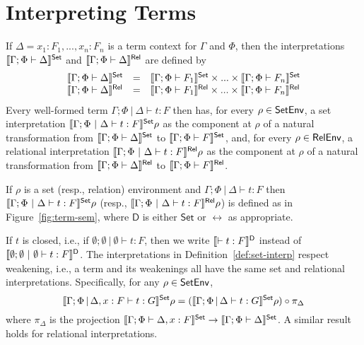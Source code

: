 \documentclass{lmcs}
\theoremstyle{plain}\newtheorem{satz}[thm]{Satz}
\newcommand{\set}{\mathsf{Set}}
\begin{document}
\section{Interpreting Terms}\label{sec:term-interp}

If $\Delta = x_1 : F_1,...,x_n : F_n$ is a term context for $\Gamma$
and $\Phi$, then the interpretations $\setsem{\Gamma;\Phi \vdash
  \Delta}$ and $\llbracket{\Gamma;\Phi \vdash \Delta}\rrbracket^{\mathsf{Rel}}$ are defined by
\[\begin{array}{lll}
\setsem{\Gamma;\Phi \vdash \Delta} & = & \setsem{\Gamma;\Phi \vdash
  F_1} \times ... \times \setsem{\Gamma;\Phi \vdash F_n}\\ 
\relsem{\Gamma;\Phi \vdash \Delta} & = & \relsem{\Gamma;\Phi \vdash
  F_1} \times ... \times \relsem{\Gamma;\Phi \vdash F_n}\\ 
\end{array}\]
Every well-formed term $\Gamma;\Phi~|~\Delta \vdash t : F$ then has,
for every $\rho \in \mathsf{SetEnv}$, a set interpretation
$\setsem{\Gamma;\Phi~|~\Delta \vdash t : F}\rho$ as the component at
$\rho$ of a natural transformation from $\setsem{\Gamma; \Phi \vdash
  \Delta}$ to $\setsem{\Gamma; \Phi \vdash F}$, and, for every $\rho
\in \mathsf{RelEnv}$, a relational interpretation
$\llbracket{\Gamma;\Phi~|~\Delta \vdash t : F}\rrbracket^{\mathsf{Rel}}\rho$ as the component at
$\rho$ of a natural transformation from $\llbracket{\Gamma; \Phi \vdash
  \Delta}\rrbracket^{\mathsf{Rel}}$ to $\llbracket{\Gamma; \Phi \vdash F}\rrbracket^{\mathsf{Rel}}$.

\begin{defi}\label{def:set-interp}
If $\rho$ is a set (resp., relation) environment and
$\Gamma;\Phi~|~\Delta \vdash t : F$ then
$\setsem{\Gamma;\Phi~|~\Delta \vdash t : F}\rho$ (resp.,
$\llbracket{\Gamma;\Phi~|~\Delta \vdash t : F}\rrbracket^{\mathsf{Rel}}\rho$) is defined as in
Figure~\ref{fig:term-sem}, where $\mathsf D$ is either $\set$ or
$\rel$ as appropriate.
\end{defi}

If $t$ is closed, i.e., if $\emptyset; \emptyset~|~\emptyset \vdash t
: F$, then we write $\llbracket{\vdash t : F}\rrbracket^{\mathsf D}$ instead of $\llbracket{\emptyset;
  \emptyset~|~\emptyset \vdash t : F}\rrbracket^{\mathsf D}$.  The interpretations in
Definition~\ref{def:set-interp} respect weakening, i.e., a term and
its weakenings all have the same set and relational
interpretations. Specifically, for any $\rho \in \mathsf{SetEnv}$,
\[\setsem{\Gamma;\Phi \,|\, \Delta, x : F \vdash t : G}\rho =
(\setsem{\Gamma;\Phi \,|\, \Delta \vdash t : G}\rho) \circ
\pi_{\Delta}\] where $\pi_{\Delta}$ is the projection
$\setsem{\Gamma;\Phi \vdash \Delta, x : F} \to
\setsem{\Gamma;\Phi \vdash \Delta}$. A similar result holds for
relational interpretations.
\end{document}
